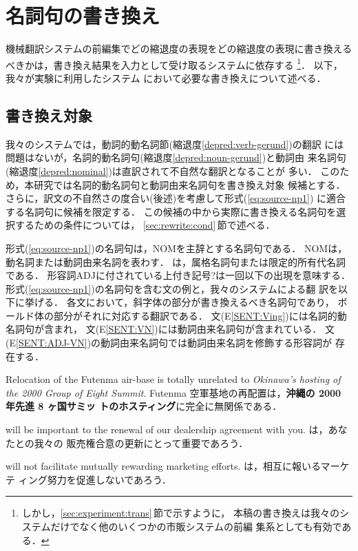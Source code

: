 \section{名詞句の書き換え}
\label{sec:rewrite}

機械翻訳システムの前編集でどの縮退度の表現をどの縮退度の表現に書き換える
べきかは，書き換え結果を入力として受け取るシステムに依存する
\footnote{しかし，\ref{sec:experiment:trans}\,節で示すように，
本稿の書き換えは我々のシステムだけでなく他のいくつかの市販システムの前編
集系としても有効である．}．
以下，我々が実験に利用したシステム
において必要な書き換えについて述べる． 

\subsection{書き換え対象}
\label{sec:rewrite:source}

我々のシステムでは，動詞的動名詞節(縮退度\ref{depred:verb-gerund})の翻訳
には問題はないが，名詞的動名詞句(縮退度\ref{depred:noun-gerund})と動詞由
来名詞句(縮退度\ref{depred:nominal})は直訳されて不自然な翻訳となることが
多い．
このため，本研究では名詞的動名詞句と動詞由来名詞句を書き換え対象
候補とする．
さらに，訳文の不自然さの度合い(後述)を考慮して形式(\ref{eq:source-np1}) 
に適合する名詞句に候補を限定する．
この候補の中から実際に書き換える名詞句を選択するための条件については，
\ref{sec:rewrite:cond}\,節で述べる．

\begin{equation}
[\ \mbox{NP}_1\mbox{'s}\ \mbox{ADJ}^?\ \mbox{NOM}\ \mbox{of}\ \mbox{NP}_2\ ]
\label{eq:source-np1}
\end{equation}
形式(\ref{eq:source-np1})の名詞句は，NOMを主辞とする名詞句である．
NOMは，動名詞または動詞由来名詞を表わす．
\NPpre は，属格名詞句または限定的所有代名詞である．
形容詞ADJに付されている上付き記号?は一回以下の出現を意味する．
形式(\ref{eq:source-np1})の名詞句を含む文の例と，我々のシステムによる翻
訳を以下に挙げる．
各文において，斜字体の部分が書き換えるべき名詞句であり， 
ボールド体の部分がそれに対応する翻訳である．
文(E\ref{SENT:Ving})には名詞的動名詞句が含まれ，
文(E\ref{SENT:VN})には動詞由来名詞句が含まれている．
文(E\ref{SENT:ADJ-VN})の動詞由来名詞句では動詞由来名詞を修飾する形容詞が
存在する．
\begin{SENT}
\sentE Relocation of the Futenma air-base is totally unrelated to 
{\it Okinawa's hosting of the 2000 Group of Eight Summit}.
\sentJ Futenma 空軍基地の再配置は，{\bf 沖縄の 2000 年先進 8 ヶ国サミッ
トのホスティング}に完全に無関係である．
\label{SENT:Ving}
\end{SENT}
\begin{SENT}
 will be 
important to the renewal of our dealership agreement with you. 
は，あなたとの我々の
販売権合意の更新にとって重要であろう．
\label{SENT:VN}
\end{SENT}
\begin{SENT}
 will not 
facilitate mutually rewarding marketing efforts.
は，相互に報いるマーケテ
ィング努力を促進しないであろう． 
\label{SENT:ADJ-VN}
\end{SENT}

